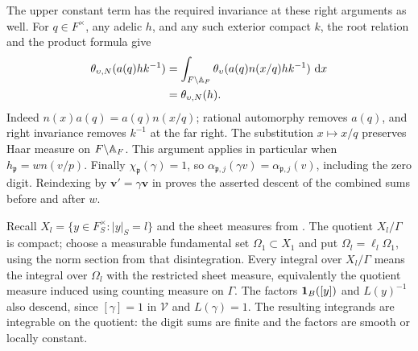 The upper constant term has the required invariance at these right
arguments as well.  For \(q\in F^\times\), any adelic \(h\), and any such
exterior compact \(k\), the root relation and the product formula give
\begin{equation}\label{eq:reflection-constant-term-descent}
\begin{split}
 \theta_{\upsilon,N}(a(q)hk^{-1})
 &=\int_{F\backslash\mathbb{A}_F}
       \theta_\upsilon(a(q)n(x/q)hk^{-1})\,\,\mathrm{d} x\\
 &=\theta_{\upsilon,N}(h).
\end{split}
\end{equation}
Indeed \(n(x)a(q)=a(q)n(x/q)\); rational automorphy removes \(a(q)\),
and right invariance removes \(k^{-1}\) at the far right.  The substitution
\(x\mapsto x/q\) preserves Haar measure on \(F\backslash\mathbb{A}_F\).
This argument applies in particular when \(h_{\mathfrak p}=wn(v/p)\).
Finally \(\chi_{\mathfrak p}(\gamma)=1\), so
\(\alpha_{\mathfrak p,j}(\gamma v)=\alpha_{\mathfrak p,j}(v)\), including
the zero digit.  Reindexing by \(\boldsymbol v'=\gamma\boldsymbol v\) in
proves the asserted descent of the combined sums before and after \(w\).

Recall \(X_l=\{y\in F_S^\times:|y|_S=l\}\) and the sheet measures from
.  The quotient \(X_l/\Gamma\) is compact;
choose a measurable fundamental set \(\Omega_1\subset X_1\) and put
\(\Omega_l=\ell_l\Omega_1\), using the norm section from that disintegration.
Every integral over \(X_l/\Gamma\) means the integral over \(\Omega_l\)
with the restricted sheet measure, equivalently the quotient measure
induced using counting measure on \(\Gamma\).  The factors
\(\mathbf{1}_B([y])\) and \(L(y)^{-1}\) also descend, since
\([\gamma]=1\) in \(\mathcal V\) and \(L(\gamma)=1\).  The resulting
integrands are integrable on the quotient: the digit sums are finite and
the factors are smooth or locally constant.

